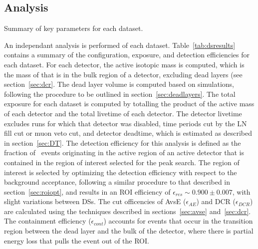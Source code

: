 \documentclass[/main.tex]{subfiles}
\begin{document}
\subsection{Analysis}
\begin{table}[h]
  \centering
  \caption[Summary of datasets]{\label{tab:dsresults}
    Summary of key parameters for each dataset.
  }
  \footnotesize
  
\end{table}
An independant analysis is performed of each dataset.
Table~\ref{tab:dsresults} contains a summary of the configuration, exposure, and detection efficiencies for each dataset.
For each detector, the active isotopic mass is computed, which is the mass of  that is in the bulk region of a detector, excluding dead layers (see section~\ref{sec:dcr}.
The dead layer volume is computed based on simulations, following the procedure to be outlined in section~\ref{sec:deadlayers}.
The total exposure for each dataset is computed by totalling the product of the active mass of each detector and the total livetime of each detector.
The detector livetime excludes runs for which that detector was disabled, time periods cut by the LN fill cut or muon veto cut, and detector deadtime, which is estimated as described in section~\ref{sec:DT}.
The detection efficiency for this analysis is defined as the fraction of \znbb\ events originating in the active region of an active detector that is contained in the region of interest selected for the peak search.
The region of interest is selected by optimizing the detection efficiency with respect to the background acceptance, following a similar procedure to that described in section~\ref{sec:roiopt}, and results in an ROI efficiency of $\epsilon_{res}\sim0.900\pm0.007$, with slight variations between DSs.
The cut officencies of AvsE ($\epsilon_{AE}$) and DCR ($\epsilon_{DCR}$) are calculated using the techniques described in sections~\ref{sec:avse} and~\ref{sec:dcr}.
The containment efficiency ($\epsilon_{cont}$) accounts for events that occur in the transition region between the dead layer and the bulk of the detector, where there is partial energy loss that pulls the event out of the ROI.
\\
\end{document}
